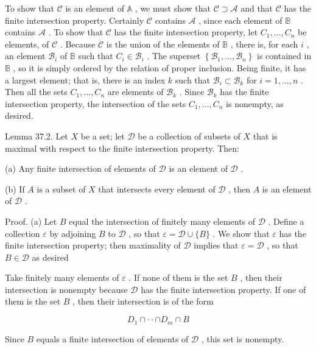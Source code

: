 \documentclass[10pt]{article}
\begin{document}
To show that \(\mathcal{C}\) is an element of \(\mathbb{A}\) , we must show that \(\mathcal{C} \supset  \mathcal{A}\) and that \(\mathcal{C}\) has the finite intersection property. Certainly \(\mathcal{C}\) contains \(\mathcal{A}\) , since each element of \(\mathbb{B}\) contains \(\mathcal{A}\) . To show that \(\mathcal{C}\) has the finite intersection property, let \({C}_{1},\ldots ,{C}_{n}\) be elements, of \(\mathcal{C}\) . Because \(\mathcal{C}\) is the union of the elements of \(\mathbb{B}\) , there is, for each \(i\) , an element \({\mathcal{B}}_{i}\) of \(\mathbb{B}\) such that \({C}_{i} \in  {\mathcal{B}}_{i}\) . The superset \(\left\{  {{\mathcal{B}}_{1},\ldots ,{\mathcal{B}}_{n}}\right\}\) is contained in \(\mathbb{B}\) , so it is simply ordered by the relation of proper inclusion. Being finite, it has a largest element; that is, there is an index \(k\) such that \({\mathcal{B}}_{i} \subset  {\mathcal{B}}_{k}\) for \(i = 1,\ldots ,n\) . Then all the sets \({C}_{1},\ldots ,{C}_{n}\) are elements of \({\mathcal{B}}_{k}\) . Since \({\mathcal{B}}_{k}\) has the finite intersection property, the intersection of the sets \({C}_{1},\ldots ,{C}_{n}\) is nonempty, as desired.

Lemma 37.2. Let \(X\) be a set; let \(\mathcal{D}\) be a collection of subsets of \(X\) that is maximal with respect to the finite intersection property. Then:

(a) Any finite intersection of elements of \(\mathcal{D}\) is an element of \(\mathcal{D}\) .

(b) If \(A\) is a subset of \(X\) that intersects every element of \(\mathcal{D}\) , then \(A\) is an element of \(\mathcal{D}\) .

Proof. (a) Let \(B\) equal the intersection of finitely many elements of \(\mathcal{D}\) . Define a collection \(\varepsilon\) by adjoining \(B\) to \(\mathcal{D}\) , so that \(\varepsilon  = \mathcal{D} \cup  \{ B\}\) . We show that \(\varepsilon\) has the finite intersection property; then maximality of \(\mathcal{D}\) implies that \(\varepsilon  = \mathcal{D}\) , so that \(B \in  \mathcal{D}\) as desired

Take finitely many elements of \(\varepsilon\) . If none of them is the set \(B\) , then their intersection is nonempty because \(\mathcal{D}\) has the finite intersection property. If one of them is the set \(B\) , then their intersection is of the form

\[
{D}_{1} \cap   \cdot   \cdot   \cap  {D}_{m} \cap  B
\]

Since \(B\) equals a finite intersection of elements of \(\mathcal{D}\) , this set is nonempty.
\end{document}
